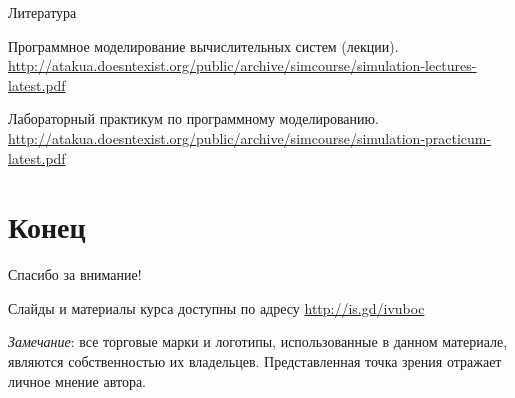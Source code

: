 \documentclass{beamer}
\begin{document}
\begin{frame}[allowframebreaks]{Литература}
\begin{thebibliography}{99}
     Программное моделирование вычислительных систем (лекции). \url{http://atakua.doesntexist.org/public/archive/simcourse/simulation-lectures-latest.pdf}

     Лабораторный практикум по программному моделированию.  \url{http://atakua.doesntexist.org/public/archive/simcourse/simulation-practicum-latest.pdf}

\end{thebibliography}
\end{frame}


\section{Конец}
\begin{frame}

{\huge{Спасибо за внимание!}\par}

\vfill

Слайды и материалы курса доступны по адресу \url{http://is.gd/ivuboc} %

\vfill

\tiny{\textit{Замечание}: все торговые марки и логотипы, использованные в данном материале, являются собственностью их владельцев. Представленная точка зрения отражает личное мнение автора.
}

\end{frame}
\end{document}
